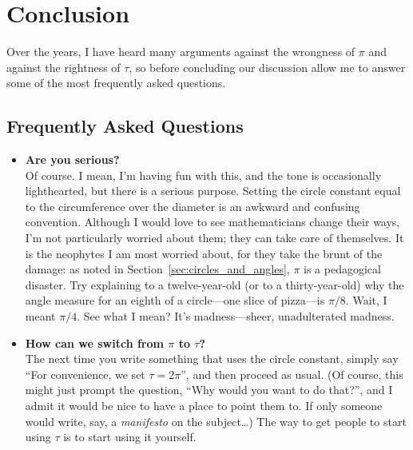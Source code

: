 {  %

\section{Conclusion}
\label{sec:conclusion}

Over the years, I have heard many arguments against the wrongness of $\pi$ and against the rightness of $\tau$, so before concluding our discussion allow me to answer some of the most frequently asked questions.

  \subsection{Frequently Asked Questions} %
  \label{sec:faq}

\begin{itemize}

  \item \textbf{Are you serious?} \\ Of course. I mean, I'm having fun with this, and the tone is occasionally lighthearted, but there is a serious purpose. Setting the circle constant equal to the circumference over the diameter is an awkward and confusing convention. Although I would love to see mathematicians change their ways, I'm not particularly worried about them; they can take care of themselves. It is the neophytes I am most worried about, for they take the brunt of the damage: as noted in Section~\ref{sec:circles_and_angles}, $\pi$ is a pedagogical disaster. Try explaining to a twelve-year-old (or to a thirty-year-old) why the angle measure for an eighth of a circle---one slice of pizza---is $\pi/8$. Wait, I meant $\pi/4$. See what I mean? It's madness---sheer, unadulterated madness.

  \item \textbf{How can we switch from $\pi$ to $\tau$?} \\ The next time you write something that uses the circle constant, simply say ``For convenience, we set $\tau = 2\pi$'', and then proceed as usual. (Of course, this might just prompt the question, ``Why would you want to do that?'', and I admit it would be nice to have a place to point them to. If only someone would write, say, a \emph{manifesto} on the subject\ldots) The way to get people to start using $\tau$ is to start using it yourself.


\end{itemize}}
